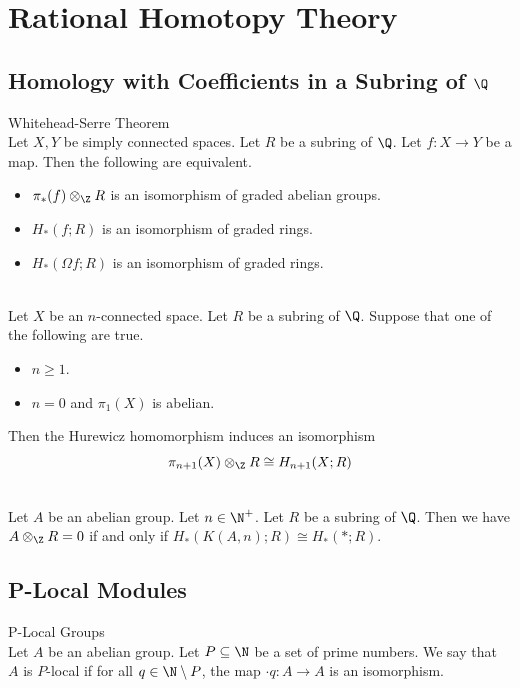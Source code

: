 \documentclass[a4paper]{article}
\begin{document}
\pagebreak
\section{Rational Homotopy Theory}
\subsection{Homology with Coefficients in a Subring of $\Q$}
\begin{thm}{Whitehead-Serre Theorem}{}\\
Let $X,Y$ be simply connected spaces. Let $R$ be a subring of $\Q$. Let $f:X\to Y$ be a map. Then the following are equivalent. 
\begin{itemize}
\item $\pi_\ast(f)\otimes_\Z R$ is an isomorphism of graded abelian groups. 
\item $H_\ast(f;R)$ is an isomorphism of graded rings. 
\item $H_\ast(\Omega f;R)$ is an isomorphism of graded rings. 
\end{itemize}
\end{thm}

\begin{lmm}{}{}\\
Let $X$ be an $n$-connected space. Let $R$ be a subring of $\Q$. Suppose that one of the following are true. 
\begin{itemize}
\item $n\geq 1$. 
\item $n=0$ and $\pi_1(X)$ is abelian. 
\end{itemize}
Then the Hurewicz homomorphism induces an isomorphism $$\pi_{n+1}(X)\otimes_\Z R\cong H_{n+1}(X;R)$$
\end{lmm}

\begin{prp}{}{}\\
Let $A$ be an abelian group. Let $n\in\N^+$. Let $R$ be a subring of $\Q$. Then we have $A\otimes_\Z R=0$ if and only if $H_\ast(K(A,n);R)\cong H_\ast(\ast;R)$. 
\end{prp}

\subsection{P-Local Modules}
\begin{defn}{P-Local Groups}{}\\
Let $A$ be an abelian group. Let $P\subseteq\N$ be a set of prime numbers. We say that $A$ is $P$-local if for all $q\in\N\setminus P$, the map $\cdot q:A\to A$ is an isomorphism. 
\end{defn}
\end{document}
